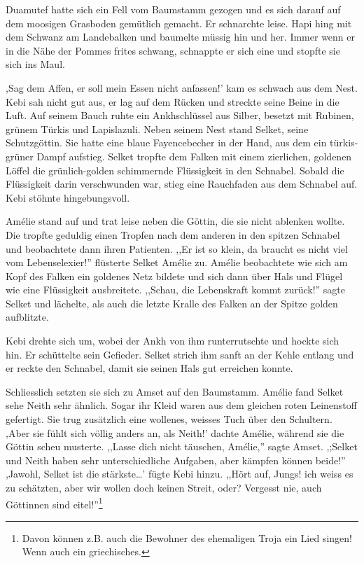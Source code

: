\documentclass[11pt,titlepage,a5paper]{book}
\begin{document}
Duamutef hatte sich ein Fell vom Baumstamm gezogen und es sich darauf auf dem moosigen Grasboden gemütlich gemacht. Er schnarchte leise. Hapi hing mit dem Schwanz am Landebalken und baumelte müssig hin und her. Immer wenn er in die Nähe der Pommes frites schwang, schnappte er sich eine und stopfte sie sich ins Maul.

,Sag dem Affen, er soll mein Essen nicht anfassen!' kam es schwach aus dem Nest. Kebi sah nicht gut aus, er lag auf dem Rücken und streckte seine Beine in die Luft. Auf seinem Bauch ruhte ein Ankhschlüssel aus Silber, besetzt mit Rubinen, grünem Türkis und Lapislazuli.  Neben seinem Nest stand Selket, seine Schutzgöttin. Sie hatte eine blaue Fayencebecher in der Hand, aus dem ein türkis-grüner Dampf aufstieg. Selket tropfte dem Falken mit einem zierlichen, goldenen Löffel die grünlich-golden schimmernde Flüssigkeit in den Schnabel. Sobald die Flüssigkeit darin verschwunden war, stieg eine Rauchfaden aus dem Schnabel auf. Kebi stöhnte hingebungsvoll.

Amélie stand auf und trat leise neben die Göttin, die sie nicht ablenken wollte. Die tropfte geduldig einen Tropfen nach dem anderen in den spitzen Schnabel und beobachtete dann ihren Patienten. ,,Er ist so klein, da braucht es nicht viel vom Lebenselexier!'' flüsterte Selket Amélie zu. Amélie beobachtete wie  sich am Kopf des Falken ein goldenes Netz bildete und sich dann über Hals und Flügel wie eine Flüssigkeit ausbreitete. ,,Schau, die Lebenskraft kommt zurück!'' sagte Selket und lächelte, als auch die letzte Kralle des Falken an der Spitze golden aufblitzte.

Kebi drehte sich um, wobei der Ankh von ihm runterrutschte und hockte sich hin. Er schüttelte sein Gefieder. Selket strich ihm sanft an der Kehle entlang und er reckte den Schnabel, damit sie seinen Hals gut erreichen konnte.

Schliesslich setzten sie sich zu Amset auf den Baumstamm. Amélie fand Selket sehe Neith sehr ähnlich. Sogar ihr Kleid waren aus dem gleichen roten Leinenstoff gefertigt. Sie trug zusätzlich eine wollenes, weisses Tuch über den Schultern. ,Aber sie fühlt sich völlig anders an, als Neith!' dachte Amélie, während sie die Göttin scheu musterte. ,,Lasse dich nicht täuschen, Amélie,'' sagte Amset. ,;Selket und Neith haben sehr unterschiedliche Aufgaben, aber kämpfen können beide!'' ,Jawohl, Selket ist die stärkste\dots' fügte Kebi hinzu. ,,Hört auf, Jungs! ich weiss es zu schätzten, aber wir wollen doch keinen Streit, oder? Vergesst nie, auch Göttinnen sind eitel!''\footnote{Davon können z.B. auch die Bewohner des ehemaligen Troja ein Lied singen! Wenn auch ein griechisches.}
\end{document}

